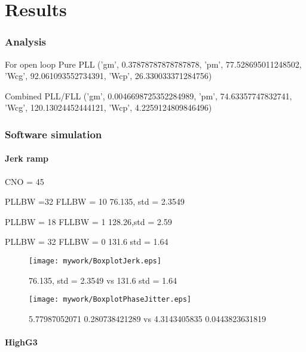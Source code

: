 \chapter{Results}\label{ch:Results}

\subsection{Analysis}

For open loop
Pure PLL
('gm', 0.37878787878787878, 'pm', 77.528695011248502, 'Wcg', 92.061093552734391, 'Wcp', 26.330033371284756)

Combined PLL/FLL
('gm', 0.0046698725352284989, 'pm', 74.63357747832741, 'Wcg', 120.13024452444121, 'Wcp', 4.2259124809846496)





\subsection{Software simulation}

\subsubsection{Jerk ramp}
CNO = 45

PLLBW =32
FLLBW = 10
76.135, std = 2.3549

PLLBW = 18
FLLBW = 1
128.26,std =  2.59 

PLLBW = 32
FLLBW = 0
131.6 std = 1.64

\begin{figure}[!htb] 
    \centering
    \texttt{[image: mywork/BoxplotJerk.eps]} 
    \caption{ 76.135, std = 2.3549 vs 131.6 std = 1.64}
    \label{fig:BoxplotJerk}
\end{figure}

\begin{figure}[!htb] 
    \centering
    \texttt{[image: mywork/BoxplotPhaseJitter.eps]} 
    \caption{5.77987052071 0.280738421289 vs 4.3143405835 0.0443823631819}
    \label{fig:BoxplotPhaseJitter}
\end{figure}

\subsubsection{HighG3}

